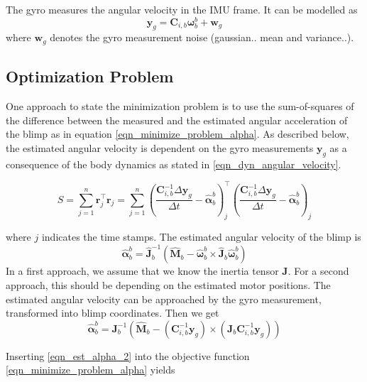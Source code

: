 The gyro measures the angular velocity in the IMU frame. It can be modelled as
\begin{equation}
\mathbf{y}_{g} = \mathbf{C}_{i,b} \boldsymbol{\omega}_b^b + \mathbf{w}_g
\end{equation}
where $\mathbf{w}_g$ denotes the gyro measurement noise (gaussian.. mean and variance..).

\subsection{Optimization Problem}
One approach to state the minimization problem is to use the sum-of-squares of the difference between the measured and the estimated angular acceleration of the blimp as in equation \eqref{eqn_minimize_problem_alpha}. As described below, the estimated angular velocity is dependent on the gyro measurements $\mathbf{y}_g$ as a consequence of the body dynamics as stated in \eqref{eqn_dyn_angular_velocity}.

\begin{equation}
\label{eqn_minimize_problem_alpha}
S = \sum_{j=1}^n {\mathbf{r}_j^\top \mathbf{r}_j} = \sum_{j=1}^n {
\left( \frac{\mathbf{C}_{i,b}^{-1} \Delta \mathbf{y}_g}{\Delta t} - \hat{\boldsymbol{\alpha}}_b^b \right)_j^\top
\left( \frac{\mathbf{C}_{i,b}^{-1} \Delta \mathbf{y}_g}{\Delta t} - \hat{\boldsymbol{\alpha}}_b^b \right)_j }
\end{equation}

where $j$ indicates the time stamps. The estimated angular velocity of the blimp is
\begin{equation}
\label{eqn_est_alpha_1}
\hat{\boldsymbol{\alpha}}_b^b = \hat{\mathbf{J}}_b^{-1} \left( \hat{\mathbf{M}}_b  - \hat{\boldsymbol{\omega}}_b^b \times \hat{\mathbf{J}}_b \hat{\boldsymbol{\omega}}_b^b \right)
\end{equation}
In a first approach, we assume that we know the inertia tensor $\mathbf{J}$. For a second approach, this should be depending on the estimated motor positions. The estimated angular velocity can be approached by the gyro measurement, transformed into blimp coordinates. Then we get
\begin{equation}
\label{eqn_est_alpha_2}
\hat{\boldsymbol{\alpha}}_b^b = \mathbf{J}_b^{-1} \left( \hat{\mathbf{M}}_b  - \left( \mathbf{C}_{i,b}^{-1} \mathbf{y}_g \right) \times \left( \mathbf{J}_b \mathbf{C}_{i,b}^{-1} \mathbf{y}_g \right) \right)
\end{equation}

Inserting \eqref{eqn_est_alpha_2} into the objective function \eqref{eqn_minimize_problem_alpha} yields

